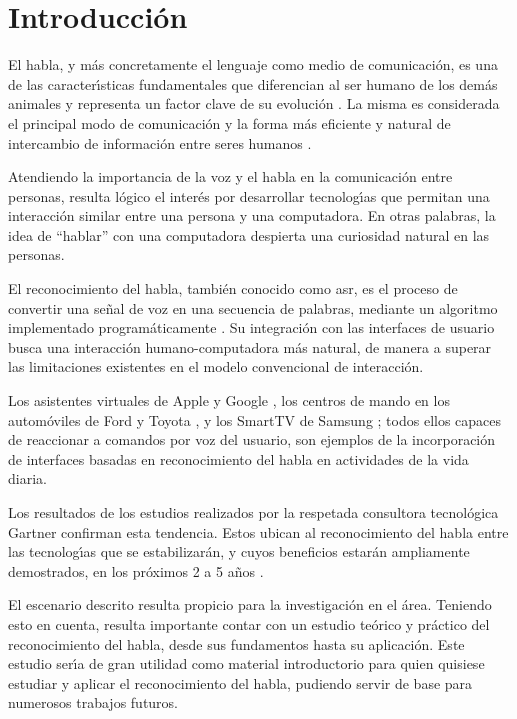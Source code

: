 \chapter{Introducci\'on}
\label{sec:intro}

El habla, y m\'as concretamente el lenguaje como medio de comunicaci\'on, es una
de las caracter{\'\i}sticas fundamentales que diferencian al ser humano de los dem\'as
animales y representa un factor clave de su evoluci\'on \cite{SchepartzLanguage1993}. 
La misma es considerada el principal modo de comunicaci\'on y la forma m\'as eficiente y 
natural de intercambio de informaci\'on entre seres humanos \cite{GaikwadAReview2010}.

Atendiendo la importancia de la voz y el habla en la comunicaci\'on entre personas,
resulta l\'ogico el inter\'es por desarrollar tecnolog{\'\i}as que permitan una interacci\'on
similar entre una persona y una computadora. En otras palabras, la idea 
de ``hablar'' con una computadora despierta una curiosidad natural en las personas.

El reconocimiento del habla, tambi\'en conocido como \gls{asr},
es el proceso de convertir una se\~nal de voz en una secuencia de
palabras, mediante un algoritmo implementado program\'aticamente \cite{JaisalAReview2012}. 
Su integraci\'on con las interfaces de usuario busca una interacci\'on humano-computadora m\'as
natural, de manera a superar las limitaciones existentes en el modelo convencional
de interacci\'on.

Los asistentes virtuales de Apple \cite{AppleSiri} y Google \cite{GoogleNow}, 
los centros de mando en los autom\'oviles de Ford \cite{FordSync} y Toyota \cite{ToyotaEntune},
y los SmartTV de Samsung \cite{SamsungVoiceControl}; todos ellos capaces de reaccionar a 
comandos por voz del usuario, son ejemplos de la incorporaci\'on de interfaces basadas 
en reconocimiento del habla en actividades de la vida diaria.

Los resultados de los estudios realizados por la respetada consultora tecnol\'ogica
Gartner confirman esta tendencia. Estos ubican al reconocimiento del habla entre
las tecnolog{\'\i}as que se estabilizar\'an, y cuyos beneficios estar\'an ampliamente
demostrados, en los pr\'oximos 2 a 5 a\~nos \cite{Gartner2013}. 

El escenario descrito resulta propicio para la investigaci\'on en el \'area.
Teniendo esto en cuenta, resulta importante contar con un estudio te\'orico
y pr\'actico del reconocimiento del habla, desde sus fundamentos hasta su
aplicaci\'on. Este estudio ser{\'\i}a de gran utilidad como material introductorio
para quien quisiese estudiar y aplicar el reconocimiento del habla, pudiendo
servir de base para numerosos trabajos futuros.

